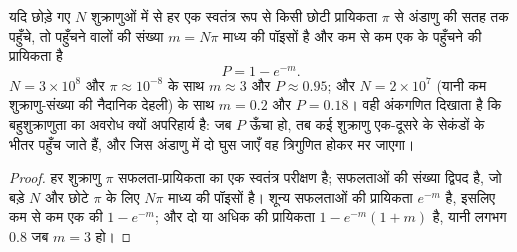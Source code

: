 \begin{theorem}[एक अंडाणु को लाखों शुक्राणु क्यों चाहिए]\label{thm:b2:mammal-reproduction:poisson}
यदि छोड़े गए $N$ शुक्राणुओं में से हर एक स्वतंत्र रूप से किसी छोटी
प्रायिकता $\pi$ से अंडाणु की सतह तक पहुँचे, तो पहुँचने वालों की संख्या
$m = N\pi$ माध्य की पॉइसों है और कम से कम एक के पहुँचने की प्रायिकता है
\[
P = 1 - e^{-m}.
\]
$N = 3\times 10^{8}$ और $\pi \approx 10^{-8}$ के साथ $m \approx 3$
और $P \approx 0.95$; और $N = 2\times 10^{7}$ (यानी कम शुक्राणु-संख्या
की नैदानिक देहली) के साथ $m = 0.2$ और $P = 0.18$। वही
अंकगणित दिखाता है कि बहुशुक्राणुता का अवरोध क्यों अपरिहार्य है: जब
$P$ ऊँचा हो, तब कई शुक्राणु एक-दूसरे के सेकंडों के भीतर पहुँच जाते हैं,
और जिस अंडाणु में दो घुस जाएँ वह त्रिगुणित होकर मर जाएगा।
\end{theorem}
\begin{proof}
हर शुक्राणु $\pi$ सफलता-प्रायिकता का एक स्वतंत्र परीक्षण है;
सफलताओं की संख्या द्विपद है, जो बड़े $N$ और छोटे
$\pi$ के लिए $N\pi$ माध्य की पॉइसों है। शून्य सफलताओं की
प्रायिकता $e^{-m}$ है, इसलिए कम से कम एक की $1 - e^{-m}$; और
दो या अधिक की प्रायिकता $1 - e^{-m}(1 + m)$ है, यानी लगभग $0.8$ जब
$m = 3$ हो।
\end{proof}

